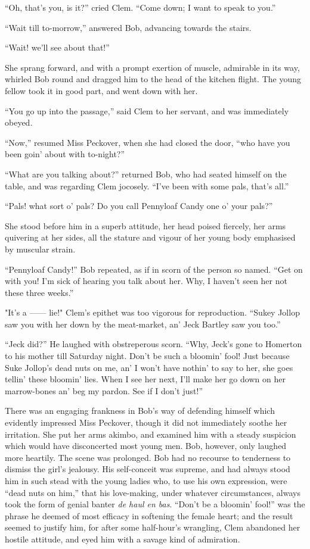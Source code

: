 ``Oh, that's you, is it?'' cried Clem. ``Come down; I want to speak to
you.''

``Wait till to-morrow,'' answered Bob, advancing towards the stairs.

``Wait! we'll see about that!''

She sprang forward, and with a prompt
{\protect\hypertarget{83}{}{}}exertion of muscle, admirable in its way,
whirled Bob round and dragged him to the head of the kitchen flight. The
young fellow took it in good part, and went down with her.

``You go up into the passage,'' said Clem to her servant, and was
immediately obeyed.

``Now,'' resumed Miss Peckover, when she had closed the door, ``who have
you been goin' about with to-night?''

``What are you talking about?'' returned Bob, who had seated himself on
the table, and was regarding Clem jocosely. ``I've been with some pals,
that's all.''

``Pals! what sort o' pals? Do you call Pennyloaf Candy one o' your
pals?''

She stood before him in a superb attitude, her head poised fiercely, her
arms quivering at her sides, all the stature and vigour of her young
body emphasised by muscular strain.

``Pennyloaf Candy!'' Bob repeated, as if in scorn of the person so
named. ``Get on with you! I'm sick of hearing you talk about her. Why, I
haven't seen her not these three weeks.''

{\protect\hypertarget{84}{}{}}"It's a {{------}} lie!" Clem's epithet
was too vigorous for reproduction. ``Sukey Jollop saw you with her down
by the meat-market, an' Jeck Bartley saw you too.''

``Jeck did?'' He laughed with obstreperous scorn. ``Why, Jeck's gone to
Homerton to his mother till Saturday night. Don't be such a bloomin'
fool! Just because Suke Jollop's dead nuts on me, an' I won't have
nothin' to say to her, she goes tellin' these bloomin' lies. When I see
her next, I'll make her go down on her marrow-bones an' beg my pardon.
See if I don't just!''

There was an engaging frankness in Bob's way of defending himself which
evidently impressed Miss Peckover, though it did not immediately soothe
her irritation. She put her arms akimbo, and examined him with a steady
suspicion which would have disconcerted most young men. Bob, however,
only laughed more heartily. The scene was prolonged. Bob had no recourse
to tenderness to dismiss the girl's jealousy. His self-conceit was
supreme, and had always stood him {\protect\hypertarget{85}{}{}}in such
stead with the young ladies who, to use his own expression, were ``dead
nuts on him,'' that his love-making, under whatever circumstances,
always took the form of genial banter \emph{de haul en bas}. ``Don't be
a bloomin' fool!'' was the phrase he deemed of most efficacy in
softening the female heart; and the result seemed to justify him, for
after some half-hour's wrangling, Clem abandoned her hostile attitude,
and eyed him with a savage kind of admiration.

